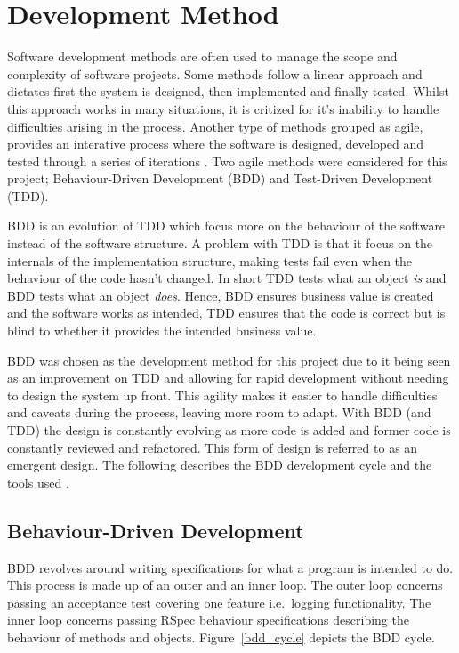 \section{Development Method} %
\label{sec:development}
Software development methods are often used to manage the scope and complexity
of software projects. Some methods follow a linear approach and dictates first
the system is designed, then implemented and finally tested. Whilst this
approach works in many situations, it is critized for it's inability to handle
difficulties arising in the process. Another type of methods grouped as agile,
provides an interative process where the software is designed,
developed and tested through a series of iterations \cite{bddintro}. 
Two agile methods were considered for this project;
Behaviour-Driven Development (BDD) and Test-Driven Development (TDD).

BDD is an evolution of TDD which focus more on the
behaviour of the software instead of the software structure. A problem with
TDD is that it focus on the internals of the implementation structure, making
tests fail even when the behaviour of the code hasn't changed. In short TDD
tests what an object \textit{is} and BDD tests what an object
\textit{does}\cite{rspecbook}. Hence, BDD ensures business value is created and
the software works as intended, TDD ensures that the code is correct but is blind to
whether it provides the intended business value.

BDD was chosen as the development method for this project due to it being seen
as an improvement on TDD and allowing for rapid development without needing to
design the system up front. This agility makes it easier to handle
difficulties and caveats during the process, leaving more room to adapt. With
BDD (and TDD) the design is constantly evolving as more code is added and
former code is constantly reviewed and refactored. This form of design is
referred to as an emergent design. The following describes the BDD development
cycle and the tools used \cite{bddintro}.

\subsection{Behaviour-Driven Development}
BDD revolves around writing specifications for
what a program is intended to do. This process is made up of an outer and an
inner loop. The outer loop concerns passing an acceptance test covering one
feature i.e.\ logging functionality. The inner loop concerns passing RSpec
behaviour specifications describing the behaviour of methods and objects.
Figure~\ref{bdd_cycle} depicts the BDD cycle.

